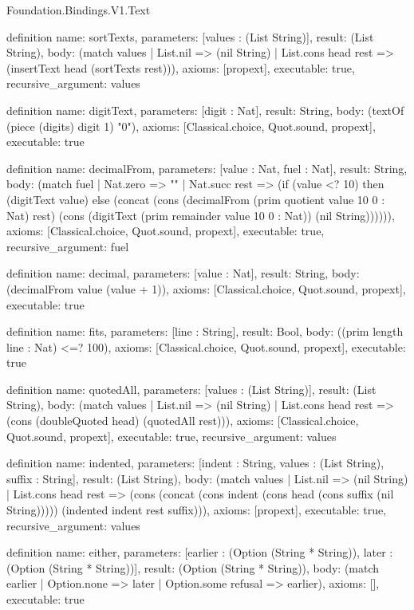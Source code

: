 \begin{lexlean}{Foundation.Bindings.V1.Text}
\begin{semanticmodule}
definition{
  name: sortTexts,
  parameters: [values : (List String)],
  result: (List String),
  body: (match values
    | List.nil => (nil String)
    | List.cons head rest => (insertText head (sortTexts rest))),
  axioms: [propext],
  executable: true,
  recursive_argument: values
}

definition{
  name: digitText,
  parameters: [digit : Nat],
  result: String,
  body: (textOf (piece (digits) digit 1) "0"),
  axioms: [Classical.choice, Quot.sound, propext],
  executable: true
}

definition{
  name: decimalFrom,
  parameters: [value : Nat, fuel : Nat],
  result: String,
  body: (match fuel
    | Nat.zero => ""
    | Nat.succ rest => (if (value <? 10) then (digitText value) else (concat (cons (decimalFrom (prim quotient value 10 0 : Nat) rest) (cons (digitText (prim remainder value 10 0 : Nat)) (nil String)))))),
  axioms: [Classical.choice, Quot.sound, propext],
  executable: true,
  recursive_argument: fuel
}

definition{
  name: decimal,
  parameters: [value : Nat],
  result: String,
  body: (decimalFrom value (value + 1)),
  axioms: [Classical.choice, Quot.sound, propext],
  executable: true
}

definition{
  name: fits,
  parameters: [line : String],
  result: Bool,
  body: ((prim length line : Nat) <=? 100),
  axioms: [Classical.choice, Quot.sound, propext],
  executable: true
}

definition{
  name: quotedAll,
  parameters: [values : (List String)],
  result: (List String),
  body: (match values
    | List.nil => (nil String)
    | List.cons head rest => (cons (doubleQuoted head) (quotedAll rest))),
  axioms: [Classical.choice, Quot.sound, propext],
  executable: true,
  recursive_argument: values
}

definition{
  name: indented,
  parameters: [indent : String, values : (List String), suffix : String],
  result: (List String),
  body: (match values
    | List.nil => (nil String)
    | List.cons head rest => (cons (concat (cons indent (cons head (cons suffix (nil String))))) (indented indent rest suffix))),
  axioms: [propext],
  executable: true,
  recursive_argument: values
}

definition{
  name: either,
  parameters: [earlier : (Option (String * String)), later : (Option (String * String))],
  result: (Option (String * String)),
  body: (match earlier | Option.none => later | Option.some refusal => earlier),
  axioms: [],
  executable: true
}


\end{semanticmodule}
\end{lexlean}
